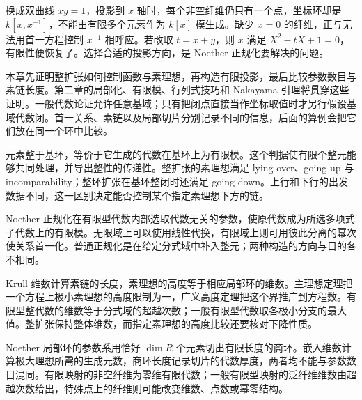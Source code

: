 换成双曲线 \(xy=1\)，投影到 \(x\) 轴时，每个非空纤维仍只有一个点，坐标环却是 \(k[x,x^{-1}]\)，不能由有限多个元素作为 \(k[x]\) 模生成。缺少 \(x=0\) 的纤维，正与无法用首一方程控制 \(x^{-1}\) 相呼应。若改取 \(t=x+y\)，则 \(x\) 满足 \(X^2-tX+1=0\)，有限性便恢复了。选择合适的投影方向，是 Noether 正规化要解决的问题。

\ProseParagraphBreak

本章先证明整扩张如何控制函数与素理想，再构造有限投影，最后比较参数数目与素链长度。第二章的局部化、有限模、行列式技巧和 Nakayama 引理将贯穿这些证明。一般代数论证允许任意基域；只有把闭点直接当作坐标取值时才另行假设基域代数闭。首一关系、素链以及局部切片分别记录不同的信息，后面的算例会把它们放在同一个环中比较。






\begin{chaptersummary}
	元素整于基环，等价于它生成的代数在基环上为有限模。这个判据使有限个整元能够共同处理，并导出整性的传递性。整扩张的素理想满足 lying-over、going-up 与 incomparability；整环扩张在基环整闭时还满足 going-down。上行和下行的出发数据不同，这一区别决定能否控制某个指定素理想下方的链。

	\ProseParagraphBreak

	Noether 正规化在有限型代数内部选取代数无关的参数，使原代数成为所选多项式子代数上的有限模。无限域上可以使用线性代换，有限域上则可用彼此分离的幂次使关系首一化。普通正规化是在给定分式域中补入整元；两种构造的方向与目的各不相同。

	\ProseParagraphBreak

	Krull 维数计算素链的长度，素理想的高度等于相应局部环的维数。主理想定理把一个方程上极小素理想的高度限制为一，广义高度定理把这个界推广到方程数。有限型整代数的维数等于分式域的超越次数；一般有限型代数取各极小分支的最大值。整扩张保持整体维数，而指定素理想的高度比较还要核对下降性质。

	\ProseParagraphBreak

	Noether 局部环的参数系用恰好 \(\dim R\) 个元素切出有限长度的商环。嵌入维数计算极大理想所需的生成元数，商环长度记录切片的代数厚度，两者均不能与参数数目混同。有限映射的非空纤维为零维有限代数；一般有限型映射的泛纤维维数由超越次数给出，特殊点上的纤维则可能改变维数、点数或幂零结构。
\end{chaptersummary}

\BookExercises

